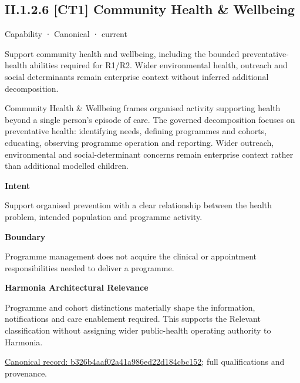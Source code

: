 \subsection*{II.1.2.6 [CT1] Community Health \& Wellbeing}
\label{navigation:II.1.2.6}

\label{element:b326b4aaf02a41a986ed22d184cbc152}
{\small Capability · Canonical · current}\par

Support community health and wellbeing, including the bounded preventative-health abilities required for R1/R2. Wider environmental health, outreach and social determinants remain enterprise context without inferred additional decomposition.



Community Health \& Wellbeing frames organised activity supporting health beyond a single person's episode of care. The governed decomposition focuses on preventative health: identifying needs, defining programmes and cohorts, educating, observing programme operation and reporting. Wider outreach, environmental and social-determinant concerns remain enterprise context rather than additional modelled children.



\textbf{Intent}



Support organised prevention with a clear relationship between the health problem, intended population and programme activity.



\textbf{Boundary}



Programme management does not acquire the clinical or appointment responsibilities needed to deliver a programme.



\textbf{Harmonia Architectural Relevance}



Programme and cohort distinctions materially shape the information, notifications and care enablement required. This supports the Relevant classification without assigning wider public-health operating authority to Harmonia.


{\footnotesize \href{../../../../continuum/strategy/capability/b326b4aaf02a41a986ed22d184cbc152.md}{Canonical record: b326b4aaf02a41a986ed22d184cbc152}; full qualifications and provenance.}\par

